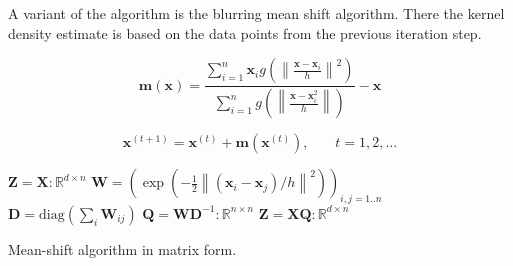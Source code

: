 \documentclass{article}
\newcommand{\norm}[1]{\left\lVert#1\right\rVert}
\begin{document}
A variant of the algorithm is the blurring mean shift algorithm. There the kernel density estimate is based on the data points from the previous iteration step.

\begin{equation}
	\bm{m}(\bm{x}) = \frac{\sum_{i=1}^n \bm{x}_i g(\norm{\frac{\bm{x} - \bm{x}_i}{h}}^2)}{\sum_{i=1}^n g(\norm{\frac{\bm{x} - \bm{x}_i^2}{h}})} - \bm{x}
\end{equation}


\begin{equation}
	\bm{x}^{(t+1)} = \bm{x}^{(t)} + \bm{m}(\bm{x}^{(t)})\text{,}\qquad t = 1, 2, ...
\end{equation}



\begin{algorithm}
	\begin{algorithmic}[1]
		\State $\bm{Z} = \bm{X} : \mathbb{R}^{d\times n}$
		\Repeat
		\State $\bm{W} = (\exp(-\frac{1}{2} \norm{(\bm{x}_i - \bm{x}_j) / h}^2))_{i,j = 1..n}$
		\State $\bm{D} = \text{diag}(\sum_i \bm{W}_{ij})$
		\State $\bm{Q} = \bm{W} \bm{D}^{-1} : \mathbb{R}^{n\times n}$
		\State $\bm{Z} = \bm{X} \bm{Q} : \mathbb{R}^{d\times n}$
		\State \Return {}
		\EndFunction
	\end{algorithmic}
	\caption{Mean-shift algorithm in matrix form.}
	\label{alg:mean-shift-algorithm-matrix-form}
\end{algorithm}
\end{document}
